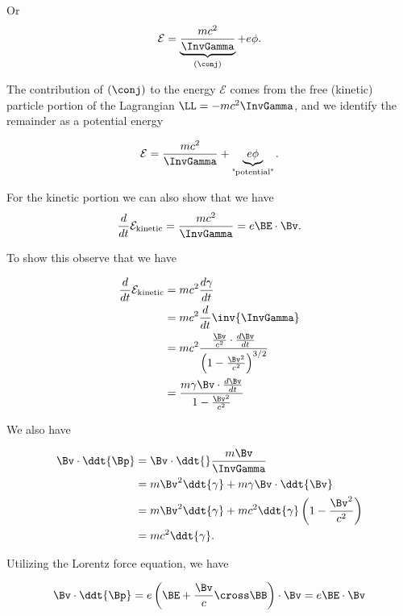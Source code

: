 Or
\begin{equation}\label{eqn:relativisticElectrodynamicsL10:210}
\mathcal{E} = \underbrace{\frac{m c^2}{\InvGamma}}_{(\conj)} + e \phi.
\end{equation}

The contribution of $(\conj)$ to the energy $\mathcal{E}$ comes from the free (kinetic) particle portion of the Lagrangian $\LL = -m c^2 \InvGamma$, and we identify the remainder as a potential energy 

\begin{equation}\label{eqn:relativisticElectrodynamicsL10:230}
\mathcal{E} = \frac{m c^2}{\InvGamma} + \underbrace{e \phi}_{\text{"potential"}}.
\end{equation}

For the kinetic portion we can also show that we have
\begin{equation}\label{eqn:relativisticElectrodynamicsL10:250}
\frac{d}{dt} \mathcal{E}_{\text{kinetic}} 
=
\frac{m c^2}{\InvGamma} 
= e \BE \cdot \Bv.
\end{equation}

To show this observe that we have

\begin{align*}
\frac{d}{dt} \mathcal{E}_{\text{kinetic}} 
&= m c^2 \frac{d\gamma}{dt} \\
&= m c^2 \frac{d}{dt} \inv{\InvGamma} \\
&= m c^2 \frac{\frac{\Bv}{c^2} \cdot \frac{d\Bv}{dt}}{\left(1 - \frac{\Bv^2}{c^2}\right)^{3/2}} \\
&= \frac{m \gamma \Bv \cdot \frac{d\Bv}{dt}}{1 - \frac{\Bv^2}{c^2}}
\end{align*}

We also have

\begin{align*}
\Bv \cdot \ddt{\Bp} 
&= \Bv \cdot \ddt{} \frac{m \Bv}{\InvGamma} \\
&= m\Bv^2 \ddt{\gamma} + m \gamma \Bv \cdot \ddt{\Bv} \\
&= m\Bv^2 \ddt{\gamma} + m c^2 \ddt{\gamma} \left( 1 - \frac{\Bv^2}{c^2} \right) \\
&= m c^2 \ddt{\gamma}.
\end{align*}

Utilizing the Lorentz force equation, we have

\begin{equation}\label{eqn:relativisticElectrodynamicsL10:270}
\Bv \cdot \ddt{\Bp} = e \left( \BE + \frac{\Bv}{c} \cross \BB \right) \cdot \Bv = e \BE \cdot \Bv
\end{equation}

